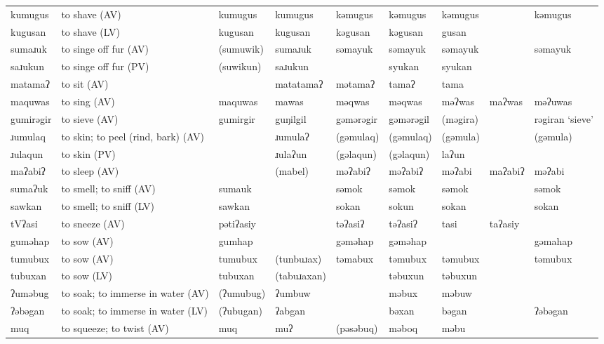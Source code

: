 \begin{landscape}
\begin{longtable}{*{9}{>{\raggedright\arraybackslash}p{}}}
\text{*}kumugus      & to shave (AV) & kumugus & kumugus & kəmugus & kəmugus & kəmugus &  & kəmugus\\
\text{*}kugusan      & to shave (LV) & kugusan & kugusan & kəgusan & kəgusan & gusan &  & \\
\text{*}sumaɹuk      & to singe off fur (AV) & (sumuwik) & sumaɹuk & səmayuk & səmayuk & səmayuk &  & səmayuk\\
\text{*}saɹukun      & to singe off fur (PV) & (suwikun) & saɹukun &  & syukan & syukan &  & \\
\text{*}matamaʔ      & to sit (AV) &  & matatamaʔ & mətamaʔ & tamaʔ & tama &  & \\
\text{*}maquwas      & to sing (AV) & maquwas & mawas & məqwas & məqwas & məʔwas & maʔwas & məʔuwas\\
\text{*}gumirəgir    & to sieve (AV) & gumirgir & guŋilgil & gəmərəgir & gəmərəgil & (məgira) &  & rəgiran `sieve'\\
\text{*}ɹumulaq      & to skin; to peel (rind, bark) (AV) &  & ɹumulaʔ & (gəmulaq) & (gəmulaq) & (gəmula) &  & (gəmula)\\
\text{*}ɹulaqun      & to skin (PV) &  & ɹulaʔun & (gəlaqun) & (gəlaqun) & laʔun &  & \\
\text{*}maʔabiʔ      & to sleep (AV) &  & (mabel) & məʔabiʔ & məʔabiʔ & məʔabi & maʔabiʔ & məʔabi\\
\text{*}sumaʔuk      & to smell; to sniff (AV) & sumauk &  & səmok & səmok & səmok &  & səmok\\
\text{*}sawkan       & to smell; to sniff (LV) & sawkan &  & sokan & sokun & sokan &  & sokan\\
\text{*}tVʔasi       & to sneeze (AV) & pətiʔasiy &  & təʔasiʔ & təʔasiʔ & tasi & taʔasiy & \\
\text{*}guməhap      & to sow (AV) & gumhap &  & gəməhap & gəməhap &  &  & gəmahap\\
\text{*}tumubux      & to sow (AV) & tumubux & (tunbuɹax) & təmabux & təmubux & təmubux &  & təmubux\\
\text{*}tubuxan      & to sow (LV) & tubuxan & (tabuɹaxan) &  & təbuxun & təbuxun &  & \\
\text{*}ʔuməbug      & to soak; to immerse in water (AV) & (ʔumubug) & ʔumbuw &  & məbux & məbuw &  & \\
\text{*}ʔəbəgan      & to soak; to immerse in water (LV) & (ʔubugan) & ʔabgan &  & bəxan & bəgan &  & ʔəbəgan\\
\text{*}muq          & to squeeze; to twist (AV) & muq & muʔ & (pəsəbuq) & məboq & məbu &  & \\

\end{longtable}
\end{landscape}
